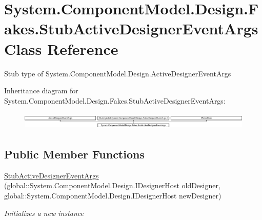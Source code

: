 \hypertarget{class_system_1_1_component_model_1_1_design_1_1_fakes_1_1_stub_active_designer_event_args}{\section{System.\-Component\-Model.\-Design.\-Fakes.\-Stub\-Active\-Designer\-Event\-Args Class Reference}
\label{class_system_1_1_component_model_1_1_design_1_1_fakes_1_1_stub_active_designer_event_args}
}


Stub type of System.\-Component\-Model.\-Design.\-Active\-Designer\-Event\-Args 


Inheritance diagram for System.\-Component\-Model.\-Design.\-Fakes.\-Stub\-Active\-Designer\-Event\-Args\-:\begin{figure}[H]
\begin{center}
\leavevmode
\includegraphics[height=0.838951cm]{class_system_1_1_component_model_1_1_design_1_1_fakes_1_1_stub_active_designer_event_args}
\end{center}
\end{figure}
\subsection*{Public Member Functions}
\begin{DoxyCompactItemize}
\item 
\hyperlink{class_system_1_1_component_model_1_1_design_1_1_fakes_1_1_stub_active_designer_event_args_a5b76b0fc72b22948480b9fed650a1695}{Stub\-Active\-Designer\-Event\-Args} (global\-::\-System.\-Component\-Model.\-Design.\-I\-Designer\-Host old\-Designer, global\-::\-System.\-Component\-Model.\-Design.\-I\-Designer\-Host new\-Designer)
\begin{DoxyCompactList}\small\item\em Initializes a new instance\end{DoxyCompactList}\end{DoxyCompactItemize}
